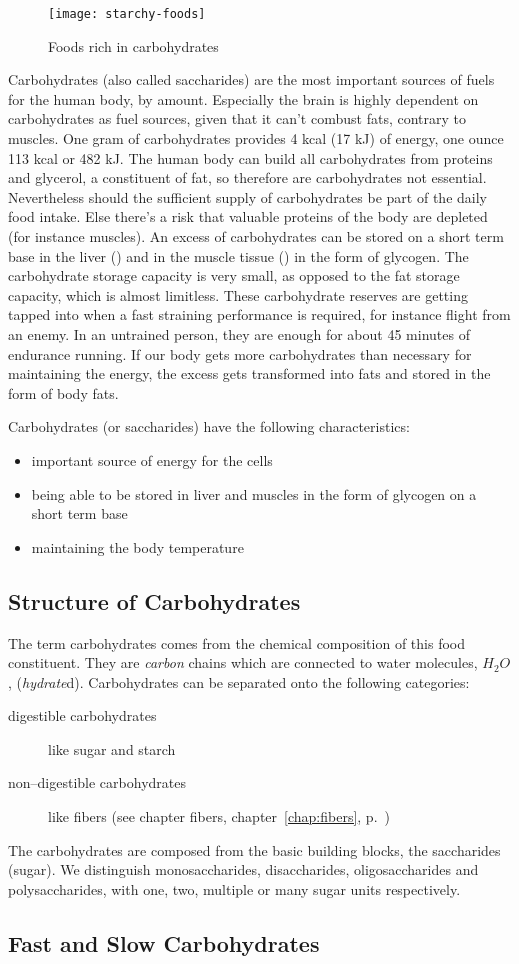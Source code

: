 \documentclass[../main.tex]{subfiles}
\begin{document}
\begin{figure}[htb!]
\centering
  \texttt{[image: starchy-foods]}
  \caption{Foods rich in carbohydrates~\cite{PicCarbohydrates}}
\end{figure}


Carbohydrates (also called saccharides) are the most important sources of fuels for the human body, by amount.
Especially the brain is highly dependent on carbohydrates as fuel sources, given that it can't combust fats, contrary to muscles.
One gram of carbohydrates provides 4 kcal (17 kJ) of energy, one ounce 113 kcal or 482 kJ.
The human body can build all carbohydrates from proteins and glycerol, a constituent of fat, so therefore are carbohydrates not essential.
Nevertheless should the sufficient supply of carbohydrates be part of the daily food intake.
Else there's a risk that valuable proteins of the body are depleted (for instance muscles).
An excess of carbohydrates can be stored on a short term base in the liver () and in the muscle tissue () in the form of glycogen.
The carbohydrate storage capacity is very small, as opposed to the fat storage capacity, which is almost limitless.
These carbohydrate reserves are getting tapped into when a fast straining performance is required, for instance flight from an enemy.
In an untrained person, they are enough for about 45 minutes of endurance running.
If our body gets more carbohydrates than necessary for maintaining the energy, the excess gets transformed into fats and stored in the form of body fats.

Carbohydrates (or saccharides) have the following characteristics:
\begin{itemize}
\item important source of energy for the cells
\item being able to be stored in liver and muscles in the form of glycogen on a short term base
\item maintaining the body temperature
\end{itemize}

\subsection{Structure of Carbohydrates}

The term carbohydrates comes from the chemical composition of this food constituent.
They are \emph{carbon} chains which are connected to water molecules, $H_2O$, (\emph{hydrate}d).
Carbohydrates can be separated onto the following categories:
\begin{description}
\item[digestible carbohydrates] like sugar and starch
\item[non--digestible carbohydrates] like fibers (see chapter fibers, chapter~\ref{chap:fibers}, p.~\pageref{chap:fibers})
\end{description}

The carbohydrates are composed from the basic building blocks, the saccharides (sugar).
We distinguish monosaccharides, disaccharides, oligosaccharides and polysaccharides, with one, two, multiple or many sugar units respectively.

\subsection{Fast and Slow Carbohydrates}
\end{document}
